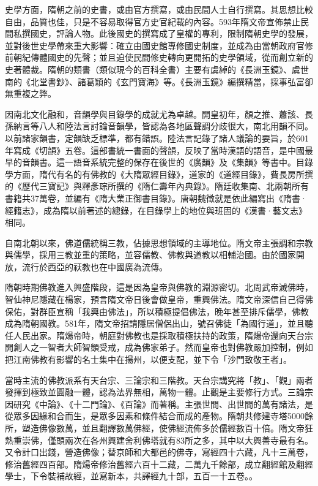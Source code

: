 史學方面，隋朝之前的史書，或由官方撰寫，或由民間人士自行撰寫。其思想比較自由，品質也佳，只是不容易取得官方史官紀載的內容。593年隋文帝宣佈禁止民間私撰國史，評論人物。此後國史的撰寫成了皇權的專利，限制隋朝史學的發展，並對後世史學帶來重大影響：確立由國史館專修國史制度，並成為由當朝政府官修前朝紀傳體國史的先聲；並且迫使民間修史轉向更開拓的史學領域，從而創立新的史著體裁。隋朝的類書（類似現今的百科全書）主要有虞綽的《長洲玉鏡》、虞世南的《北堂書鈔》、諸葛穎的《玄門寶海》等。《長洲玉鏡》編撰精當，採事弘富卻無重複之弊。

因南北文化融和，音韻學與目錄學的成就尤為卓越。開皇初年，顏之推、蕭該、長孫納言等八人和陸法言討論音韻學，皆認為各地區聲調分歧很大，南北用韻不同。以前諸家韻書，定韻缺乏標準，都有錯誤。陸法言記錄了諸人議論的要旨，於601年寫成《切韻》五卷。這部書統一書面的聲韻，反映了當時漢語的語音，是中國最早的音韻書。這一語音系統完整的保存在後世的《廣韻》及《集韻》等書中。目錄學方面，隋代有名的有佛教的《大隋眾經目錄》，道家的《道經目錄》，費長房所撰的《歷代三寶記》與釋彥琮所撰的《隋仁壽年內典錄》。隋廷收集南、北兩朝所有書籍共37萬卷，並編有《隋大業正御書目錄》。唐朝魏徵就是依此編寫出《隋書·經籍志》，成為隋以前著述的總錄，在目錄學上的地位與班固的《漢書·藝文志》相同。

自南北朝以來，佛道儒統稱三教，佔據思想領域的主導地位。隋文帝主張調和宗教與儒學，採用三教並重的策略，並容儒教、佛教與道教以相輔治國。由於國家開放，流行於西亞的祆教也在中國廣為流傳。

隋朝時期佛教進入興盛階段，這是因為皇帝與佛教的淵源密切。北周武帝滅佛時，智仙神尼隱藏在楊家，預言隋文帝日後會做皇帝，重興佛法。隋文帝深信自己得佛保佑，對群臣宣稱「我興由佛法」，所以積極提倡佛法，晚年甚至排斥儒學，佛教成為隋朝國教。581年，隋文帝招請隱居僧侶出山，號召佛徒「為國行道」，並且聽任人民出家。隋煬帝時，朝庭對佛教也是採取積極扶持的政策，隋煬帝還向天台宗開創人之一智者大師智顗受戒，成為佛家弟子。然而皇帝也對佛教嚴加控制，例如把江南佛教有影響的名士集中在揚州，以便支配，並下令「沙門致敬王者」。

當時主流的佛教派系有天台宗、三論宗和三階教。天台宗講究將「教」、「觀」兩者發揮到極致並圓融一體，認為法界無相，萬物一體。止觀是主要修行方式。三論宗因研究《中論》、《十二門論》、《百論》而著稱。主張世間、出世間的萬有諸法，是從眾多因緣和合而生，是眾多因素和條件結合而成的產物。隋朝共修建寺塔5000餘所，塑造佛像數萬，並且翻譯數萬佛經，使佛經流佈多於儒經數百十倍。隋文帝狂熱重崇佛，僅頭兩次在各州興建舍利佛塔就有83所之多，其中以大興善寺最有名。又令計口出錢，營造佛像；替京師和大都邑的佛寺，寫經四十六藏，凡十三萬卷，修治舊經四百部。隋煬帝修治舊經六百十二藏，二萬九千餘部，成立翻經館及翻經學士，下令裝補故經，並寫新本，共譯經九十部，五百一十五卷。。

